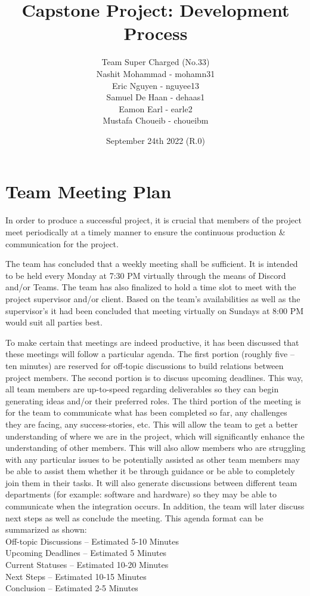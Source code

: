 \documentclass[12pt,a4]{report}
\title{Capstone Project: Development Process}
\author{Team Super Charged (No.33)\\Nashit Mohammad - mohamn31\\Eric Nguyen - nguyee13\\Samuel De Haan - dehaas1\\Eamon Earl - earle2\\Mustafa Choueib - choueibm}
\date{September 24th 2022 (R.0)}
\begin{document}
\maketitle
\newpage

\section*{Team Meeting Plan}
In order to produce a successful project, it is crucial that members of the project meet periodically at a timely manner to ensure the continuous production \& communication for the project. 

The team has concluded that a weekly meeting shall be sufficient. It is intended to be held every Monday at 7:30 PM virtually through the means of Discord and/or Teams. The team has also finalized to hold a time slot to meet with the project supervisor and/or client. Based on the team’s availabilities as well as the supervisor’s it had been concluded that meeting virtually on Sundays at 8:00 PM would suit all parties best. 

To make certain that meetings are indeed productive, it has been discussed that these meetings will follow a particular agenda. The first portion (roughly five – ten minutes) are reserved for off-topic discussions to build relations between project members. The second portion is to discuss upcoming deadlines. This way, all team members are up-to-speed regarding deliverables so they can begin generating ideas and/or their preferred roles. The third portion of the meeting is for the team to communicate what has been completed so far, any challenges they are facing, any success-stories, etc. This will allow the team to get a better understanding of where we are in the project, which will significantly enhance the understanding of other members. This will also allow members who are struggling with any particular issues to be potentially assisted as other team members may be able to assist them whether it be through guidance or be able to completely join them in their tasks. It will also generate discussions between different team departments (for example: software and hardware) so they may be able to communicate when the integration occurs. In addition, the team will later discuss next steps as well as conclude the meeting. This agenda format can be summarized as shown:\\

\noindent Off-topic Discussions – Estimated 5-10 Minutes\\
Upcoming Deadlines – Estimated 5 Minutes\\
Current Statuses – Estimated 10-20 Minutes\\
Next Steps – Estimated 10-15 Minutes\\
Conclusion – Estimated 2-5 Minutes\\
\end{document}
